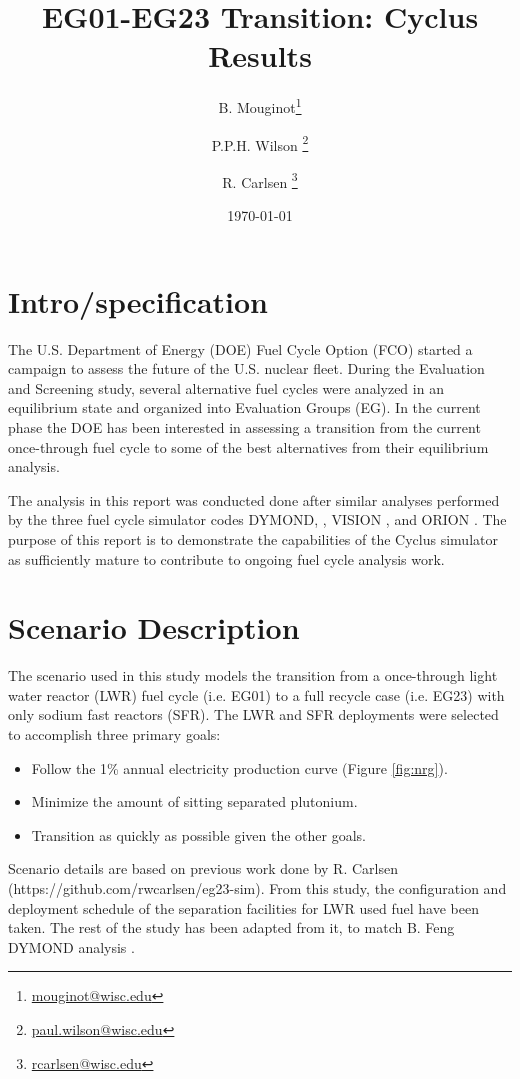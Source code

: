 \documentclass[12pt]{article}
\title{EG01-EG23 Transition: Cyclus Results}
\author[1]{B. Mouginot\thanks{\href{mailto:mouginot@wisc.edu}{mouginot@wisc.edu}}}
\author[1]{P.P.H. Wilson \thanks{\href{mailto:paul.wilson@wisc.edu}{paul.wilson@wisc.edu}}}
\author[1]{R. Carlsen \thanks{\href{mailto:rcarlsen@wisc.edu}{rcarlsen@wisc.edu}}}
\affil[1]{University of Wisconsin--Madison, Department of Engineering Physics, CNERG group}
\date{\today}
\begin{document}
\maketitle

\section{Intro/specification}

The U.S. Department of Energy (DOE) Fuel Cycle Option (FCO) started a campaign
to assess the future of the U.S. nuclear fleet. During the Evaluation and Screening study, 
several alternative fuel cycles were analyzed in an equilibrium state and organized into Evaluation
Groups (EG).  In the current phase the DOE has been interested in assessing a transition from the
current once-through fuel cycle to some of the best alternatives from their
equilibrium analysis.

The analysis in this report was conducted done after similar analyses performed by the
three fuel cycle simulator codes DYMOND, \cite{dymon}, VISION \cite{vision},
and ORION \cite{orion}. The purpose of this report is to demonstrate the
capabilities of the Cyclus simulator \cite{cyclus} as sufficiently mature to
contribute to ongoing fuel cycle analysis work.

\section{Scenario Description}

The scenario used in this study models the transition from a once-through
light water reactor (LWR) fuel cycle (i.e. EG01) to a 
full recycle case (i.e. EG23) with only sodium fast reactors
(SFR).  The LWR and SFR deployments were
selected to accomplish three primary goals:

\begin{itemize}
    \item Follow the 1\% annual electricity production curve (Figure \ref{fig:nrg}).
    \item Minimize the amount of sitting separated plutonium.
    \item Transition as quickly as possible given the other goals.
\end{itemize}

Scenario details are based on previous work done by R. Carlsen
(https://github.com/rwcarlsen/eg23-sim).  From this study, the configuration
and deployment schedule of the separation facilities for LWR used fuel have
been taken. The rest of the study has been adapted from it, to match B. Feng
DYMOND analysis \cite{B.Feng_calculation}.
\end{document}
